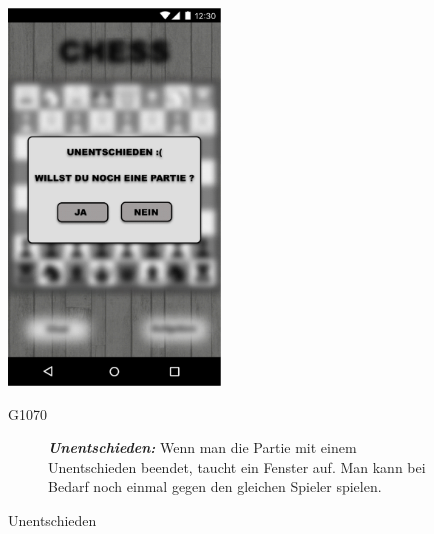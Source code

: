 \documentclass[parskip=full]{scrartcl}
\begin{document}
	\begin{figure}[htp]
		\begin{minipage}[t]{6cm}
			\vspace{0pt}
			\includegraphics[height=100mm]{unentschieden.png}
			\caption{Unentschieden}
			\label{fig:Unentschieden}
		\end{minipage}
		\hfill
		\begin{minipage}[t]{6cm}
			\vspace{0pt}
			\begin{description}
				\item[G1070] \textbf{\textit{Unentschieden: }} Wenn man die Partie mit einem Unentschieden beendet, taucht ein Fenster auf. Man kann bei Bedarf noch einmal gegen den gleichen Spieler spielen.
			\end{description}
		\end{minipage}
		

\end{figure}
\end{document}
